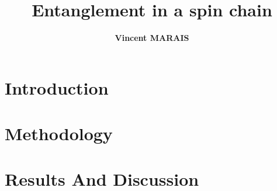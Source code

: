 \documentclass[12pt,a4paper]{article}
\title{Entanglement in a spin chain}
\author{\textbf{Vincent MARAIS}}
\begin{document}
	

\newpage





\newpage
\pagestyle{arabicstyle}
\section{Introduction}



\newpage
	

\section{Methodology}




\newpage 

\section{Results And Discussion}


\newpage



\end{document}
